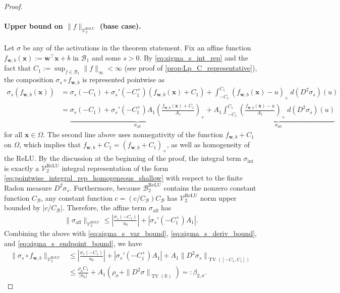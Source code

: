 \documentclass{article}
\DeclareMathOperator{\TV}{TV}
\DeclareMathOperator{\ReLU}{\mathrm{ReLU}}
\def\vw{{\bm{w}}}
\def\vx{{\bm{x}}}
\def\cB{{\mathcal{B}}}
\def\cV{{\mathcal{V}}}
\newcommand{\R}{\mathbb{R}}
\begin{document}
\begin{appendices}
\begin{proof}
    \paragraph{Upper bound on $\| f \|_{\cV_2^{\ReLU}}$ (base case).} Let $\sigma$ be any of the activations in the theorem statement. Fix an affine function $f_{\vw,b}(\vx) := \vw^\top \vx + b$ in $\cB_1$ and some $s > 0$. By \eqref{eq:sigma_s_int_rep} and the fact that $C_1 := \sup_{f \in \cB_1} \| f \|_\infty < \infty$ (see proof of \cref{prop:Lp_C_representative}), the composition $\sigma_s \circ f_{\vw,b}$ is represented pointwise as
    \begin{align}
        \sigma_s(f_{\vw,b}(\vx)) &= \sigma_s(-C_1) + \sigma_s'(-C_1^+) ( f_{\vw,b}(\vx) +C_1) + \int_{-C_1}^{C_1} (f_{\vw,b}(\vx)-u)_+ \ d (D^2 \sigma_s)(u) \\
        &= \underbrace{\sigma_s(-C_1) + \sigma_s'(-C_1^+) A_1 \left( \frac{f_{\vw,b}(\vx) +C_1}{A_1} \right)_+}_{\sigma_\mathrm{aff}} + A_1 \underbrace{ \int_{-C_1}^{C_1} \left( \frac{f_{\vw,b}(\vx)-u}{A_1} \right)_+ \ d (D^2 \sigma_s)(u)}_{\sigma_\mathrm{int}} 
    \end{align}
    for all $\vx \in \Omega$. The second line above uses nonnegativity of the function $f_{\vw,b} + C_1$ on $\Omega$, which implies that $f_{\vw,b} + C_1 = (f_{\vw,b} + C_1)_+$, as well as homogeneity of the ReLU. By the discussion at the beginning of the proof, the integral term $\sigma_\mathrm{int}$ is exactly a $\cV_2^{\ReLU}$ integral representation of the form \eqref{eq:pointwise_integral_rep_homogeneous_shallow} with respect to the finite Radon measure $D^2 \sigma_s$. Furthermore, because $\cB_2^{\ReLU}$ contains the nonzero constant function $C_{\cB}$, any constant function $c = (c/C_{\cB}) C_{\cB}$ has $\cV_2^{\ReLU}$ norm upper bounded by $|c/C_{\cB}|$. Therefore, the affine term $\sigma_{\mathrm{aff}}$ has
    \begin{align}
        \| \sigma_{\mathrm{aff}} \|_{\cV_2^{\ReLU}} \leq \left| \frac{\sigma_s(-C_1)}{u_0} \right| + |\sigma_s'(-C_1^+) A_1|.
    \end{align}
    Combining the above with \eqref{eq:sigma_s_var_bound}, \eqref{eq:sigma_s_deriv_bound}, and \eqref{eq:sigma_s_endpoint_bound}, we have
    \begin{align} \label{eq:sigma_s_f_w_b_bound}
        \| \sigma_s \circ f_{\vw,b} \|_{\cV_2^{\ReLU}} &\leq \left| \frac{\sigma_s(-C_1)}{u_0} \right| + |\sigma_s'(-C_1^+) A_1| + A_1 \| D^2 \sigma_s  \|_{\TV([-C_1, C_1])} \\
        &\leq \frac{\rho_\sigma C_1}{|u_0|} + A_1 \left( \rho_\sigma + \| D^2 \sigma \|_{\TV(\R)} \right) =: \beta_{2,\sigma}.

\end{align}
\end{proof}
\end{appendices}
\end{document}
